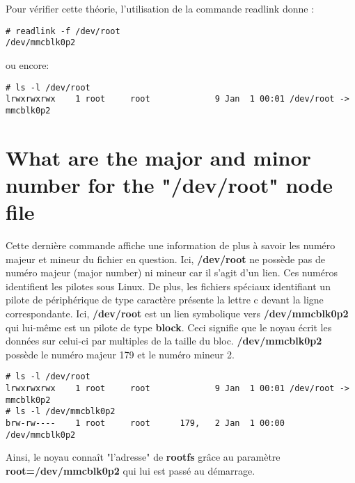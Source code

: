 Pour vérifier cette théorie, l'utilisation de la commande readlink donne :
\begin{lstlisting}
# readlink -f /dev/root
/dev/mmcblk0p2
\end{lstlisting}
ou encore:
\begin{lstlisting}
# ls -l /dev/root
lrwxrwxrwx    1 root     root             9 Jan  1 00:01 /dev/root -> mmcblk0p2
\end{lstlisting}

\section{What are the major and minor number for the "/dev/root" node file}
Cette dernière commande affiche une information de plus à savoir les numéro majeur et mineur du fichier en question. Ici, \textbf{/dev/root} ne possède pas de numéro majeur (major number) ni mineur car il s'agit d'un lien. Ces numéros identifient les pilotes sous Linux. De plus, les fichiers spéciaux identifiant un pilote de périphérique de type caractère présente la lettre c devant la ligne correspondante. Ici, \textbf{/dev/root} est un lien symbolique vers \textbf{/dev/mmcblk0p2} qui lui-même est un pilote de type \textbf{block}. Ceci signifie que le noyau écrit les données sur celui-ci par multiples de la taille du bloc. \textbf{/dev/mmcblk0p2} possède le numéro majeur 179 et le numéro mineur 2.
\begin{lstlisting}[style=Bash]
# ls -l /dev/root
lrwxrwxrwx    1 root     root             9 Jan  1 00:01 /dev/root -> mmcblk0p2
# ls -l /dev/mmcblk0p2
brw-rw----    1 root     root      179,   2 Jan  1 00:00 /dev/mmcblk0p2
\end{lstlisting}

Ainsi, le noyau connaît "l'adresse" de \textbf{rootfs} grâce au paramètre \textbf{root=/dev/mmcblk0p2} qui lui est passé au démarrage.
